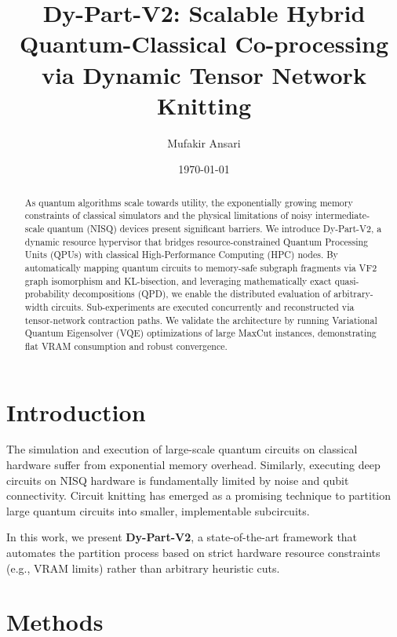 \documentclass[aps,prx,twocolumn,superscriptaddress,nofootinbib]{revtex4-2}
\begin{document}
\title{Dy-Part-V2: Scalable Hybrid Quantum-Classical Co-processing via Dynamic Tensor Network Knitting}

\author{Mufakir Ansari}

\date{\today}

\begin{abstract}
As quantum algorithms scale towards utility, the exponentially growing memory constraints of classical simulators and the physical limitations of noisy intermediate-scale quantum (NISQ) devices present significant barriers. We introduce Dy-Part-V2, a dynamic resource hypervisor that bridges resource-constrained Quantum Processing Units (QPUs) with classical High-Performance Computing (HPC) nodes. By automatically mapping quantum circuits to memory-safe subgraph fragments via VF2 graph isomorphism and KL-bisection, and leveraging mathematically exact quasi-probability decompositions (QPD), we enable the distributed evaluation of arbitrary-width circuits. Sub-experiments are executed concurrently and reconstructed via tensor-network contraction paths. We validate the architecture by running Variational Quantum Eigensolver (VQE) optimizations of large MaxCut instances, demonstrating flat VRAM consumption and robust convergence.
\end{abstract}

\maketitle

\section{Introduction}
The simulation and execution of large-scale quantum circuits on classical hardware suffer from exponential memory overhead. Similarly, executing deep circuits on NISQ hardware is fundamentally limited by noise and qubit connectivity. Circuit knitting \cite{Piveteau2022, Mitarai2021} has emerged as a promising technique to partition large quantum circuits into smaller, implementable subcircuits. 

In this work, we present \textbf{Dy-Part-V2}, a state-of-the-art framework that automates the partition process based on strict hardware resource constraints (e.g., VRAM limits) rather than arbitrary heuristic cuts.

\section{Methods}
\end{document}
